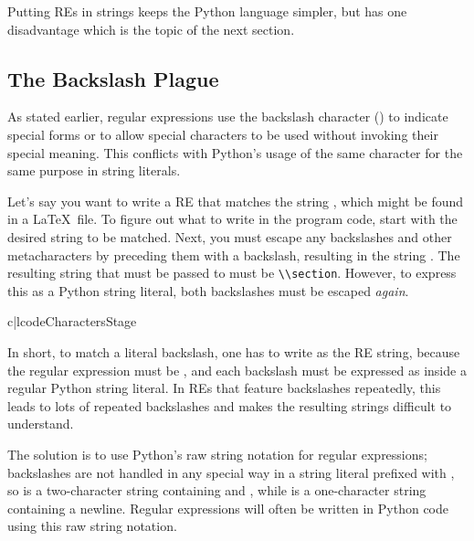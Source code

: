 \documentclass{howto}
\begin{document}
Putting REs in strings keeps the Python language simpler, but has one
disadvantage which is the topic of the next section.

\subsection{The Backslash Plague}

As stated earlier, regular expressions use the backslash
character (\character{\e}) to indicate special forms or to allow
special characters to be used without invoking their special meaning.
This conflicts with Python's usage of the same character for the same
purpose in string literals.

Let's say you want to write a RE that matches the string
, which might be found in a \LaTeX\ file.  To figure
out what to write in the program code, start with the desired string
to be matched.  Next, you must escape any backslashes and other
metacharacters by preceding them with a backslash, resulting in the
string .  The resulting string that must be passed
to  must be \verb|\\section|.  However, to
express this as a Python string literal, both backslashes must be
escaped \emph{again}.

\begin{tableii}{c|l}{code}{Characters}{Stage}
\end{tableii}

In short, to match a literal backslash, one has to write
 as the RE string, because the regular expression
must be \samp{\e\e}, and each backslash must be expressed as
\samp{\e\e} inside a regular Python string literal.  In REs that
feature backslashes repeatedly, this leads to lots of repeated
backslashes and makes the resulting strings difficult to understand.

The solution is to use Python's raw string notation for regular
expressions; backslashes are not handled in any special way in
a string literal prefixed with , so  is a
two-character string containing \character{\e} and ,
while  is a one-character string containing a newline.
Regular expressions will often be written in Python
code using this raw string notation.  
\end{document}
